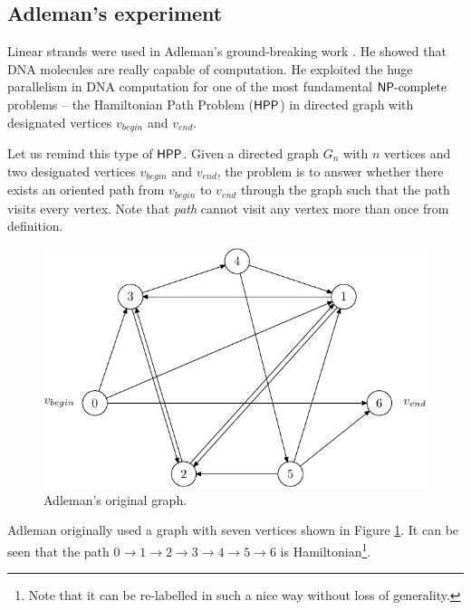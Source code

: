 	\subsection{Adleman's experiment}
	\label{sec:adleman}
		
		Linear strands were used in Adleman's ground-breaking work \cite{adleman94}. He showed that DNA molecules are really capable of computation. He exploited the huge parallelism in DNA computation for one of the most fundamental $\mathsf{NP}\textnormal{-complete}$ problems -- the Hamiltonian Path Problem ($\sf HPP$) in directed graph with designated vertices $v_{begin}$ and $v_{end}$.
		
		Let us remind this type of $\sf HPP$. Given a directed graph $G_n$ with $n$ vertices and two designated vertices $v_{begin}$ and $v_{end}$, the problem is to answer whether there exists an oriented path from $v_{begin}$ to $v_{end}$ through the graph such that the path visits every vertex. Note that {\em path} cannot visit any vertex more than once from definition.
		
		\begin{figure}[h]
		\begin{center}
			\includegraphics{./figures/adleman_graph.pdf}
			\caption{Adleman's original graph.}
			\label{fig:adleman_graph}
		\end{center}
		\end{figure}
		
		Adleman originally used a graph with seven vertices shown in Figure \ref{fig:adleman_graph}. It can be seen that the path $0 \rightarrow 1 \rightarrow 2 \rightarrow 3 \rightarrow 4 \rightarrow 5 \rightarrow 6$ is Hamiltonian\footnote{Note that it can be re-labelled in such a nice way without loss of generality.}.
		
